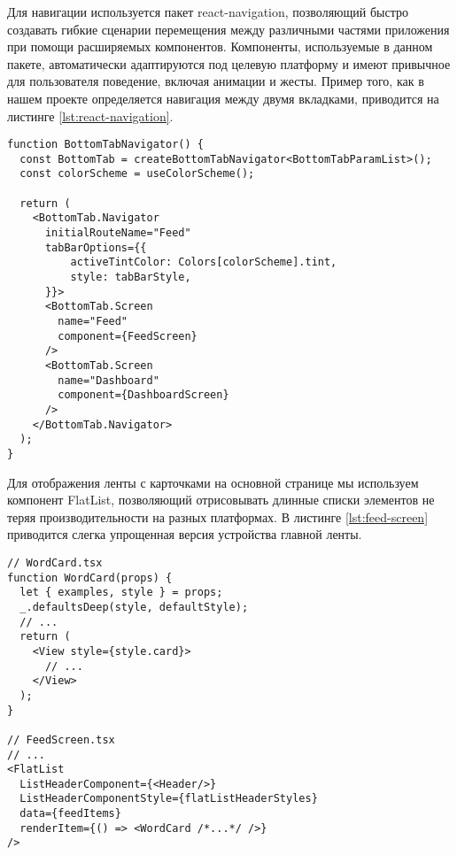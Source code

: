 Для навигации используется пакет react-navigation, позволяющий быстро создавать гибкие сценарии перемещения между различными частями приложения при помощи расширяемых компонентов. Компоненты, используемые в данном пакете, автоматически адаптируются под целевую платформу и имеют привычное для пользователя поведение, включая анимации и жесты. Пример того, как в нашем проекте определяется навигация между двумя вкладками, приводится на листинге \ref{lst:react-navigation}.
\begin{lstlisting}[basicstyle=\fontsize{11}{11}\selectfont,tabsize=4,breaklines=true,caption={Навигация с использованием вкладок.},captionpos=b,label={lst:react-navigation}]
function BottomTabNavigator() {
  const BottomTab = createBottomTabNavigator<BottomTabParamList>();
  const colorScheme = useColorScheme();

  return (
    <BottomTab.Navigator
      initialRouteName="Feed"
      tabBarOptions={{
          activeTintColor: Colors[colorScheme].tint,
          style: tabBarStyle,
      }}>
      <BottomTab.Screen
        name="Feed"
        component={FeedScreen}
      />
      <BottomTab.Screen
        name="Dashboard"
        component={DashboardScreen}
      />
    </BottomTab.Navigator>
  );
}
\end{lstlisting}

Для отображения ленты с карточками на основной странице мы используем компонент FlatList, позволяющий отрисовывать длинные списки элементов не теряя производительности на разных платформах. В листинге \ref{lst:feed-screen} приводится слегка упрощенная версия устройства главной ленты.
\begin{lstlisting}[basicstyle=\fontsize{11}{11}\selectfont,tabsize=4,breaklines=true,caption={Структура главной ленты с карточками.},captionpos=b,label={lst:feed-screen}]
// WordCard.tsx
function WordCard(props) {
  let { examples, style } = props;
  _.defaultsDeep(style, defaultStyle);
  // ...
  return (
    <View style={style.card}>
      // ...
    </View>
  );
}

// FeedScreen.tsx
// ...
<FlatList
  ListHeaderComponent={<Header/>}
  ListHeaderComponentStyle={flatListHeaderStyles}
  data={feedItems}
  renderItem={() => <WordCard /*...*/ />}
/>
\end{lstlisting}

